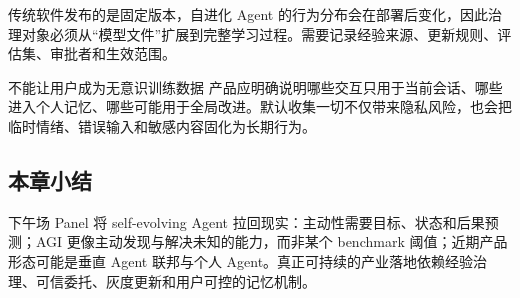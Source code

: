 传统软件发布的是固定版本，自进化 Agent 的行为分布会在部署后变化，因此治理对象必须从“模型文件”扩展到完整学习过程。需要记录经验来源、更新规则、评估集、审批者和生效范围。

\begin{warningbox}{不能让用户成为无意识训练数据}
产品应明确说明哪些交互只用于当前会话、哪些进入个人记忆、哪些可能用于全局改进。默认收集一切不仅带来隐私风险，也会把临时情绪、错误输入和敏感内容固化为长期行为。
\end{warningbox}

\subsection{本章小结}

下午场 Panel 将 self-evolving Agent 拉回现实：主动性需要目标、状态和后果预测；AGI 更像主动发现与解决未知的能力，而非某个 benchmark 阈值；近期产品形态可能是垂直 Agent 联邦与个人 Agent。真正可持续的产业落地依赖经验治理、可信委托、灰度更新和用户可控的记忆机制。
